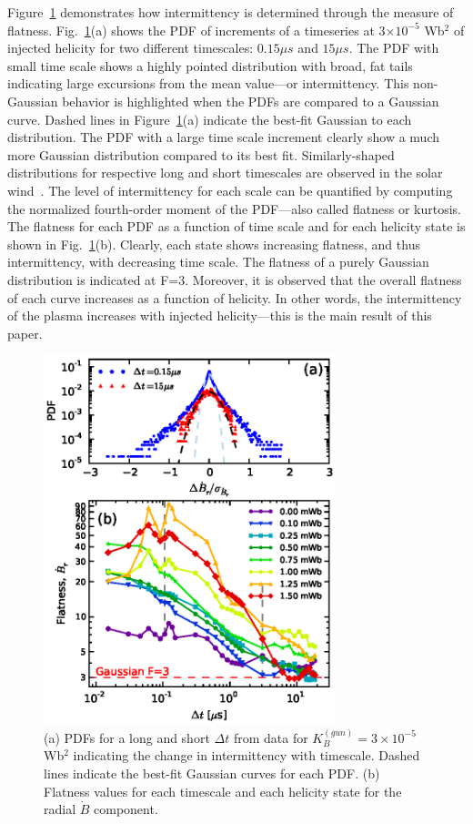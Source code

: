 \documentclass[aps,prl,amsmath,amssymb,reprint,superscriptaddress]{revtex4-1} %
\begin{document}
Figure~\ref{fig:Br_flatness} demonstrates how intermittency is determined through the measure of flatness.  Fig.~\ref{fig:Br_flatness}(a) shows the PDF of increments of a timeseries at 3$\times 10^{-5}$ Wb$^{2}$ of injected helicity for two different timescales: $0.15\mu s$ and $15\mu s$.  The PDF with small time scale shows a highly pointed distribution with broad, fat tails indicating large excursions from the mean value---or intermittency. This non-Gaussian behavior is highlighted when the PDFs are compared to a Gaussian curve. Dashed lines in Figure~\ref{fig:Br_flatness}(a) indicate the best-fit Gaussian to each distribution. The PDF with a large time scale increment clearly show a much more Gaussian distribution compared to its best fit. Similarly-shaped distributions for respective long and short timescales are observed in the solar wind~\cite{sorrisovalvo99}. The level of intermittency for each scale can be quantified by computing the normalized fourth-order moment of the PDF---also called flatness or kurtosis. The flatness for each PDF as a function of time scale and for each helicity state is shown in Fig.~\ref{fig:Br_flatness}(b). Clearly, each state shows increasing flatness, and thus intermittency, with decreasing time scale. The flatness of a purely Gaussian distribution is indicated at F=3. Moreover, it is observed that the overall flatness of each curve increases as a function of helicity. In other words, the intermittency of the plasma increases with injected helicity---this is the main result of this paper.

\begin{figure}[!htbp]
\centerline{
\includegraphics[width=8.5cm]{figure3.eps}}
\caption{\label{fig:Br_flatness} (a) PDFs for a long and short $\Delta t$ from data for $K_{B}^{(gun)} = 3\times 10^{-5}$ Wb$^{2}$ indicating the change in intermittency with timescale. Dashed lines indicate the best-fit Gaussian curves for each PDF. (b) Flatness values for each timescale and each helicity state for the radial $\dot{B}$ component.}
\end{figure}
\end{document}
